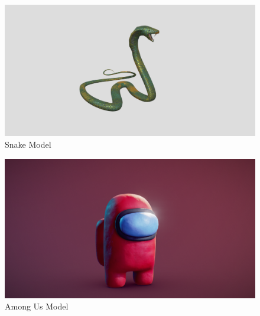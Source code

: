 \documentclass{article}
\begin{document}
    \begin{figure}
        \centering
        \includegraphics[width=\textwidth]{images/models/snake.png}
        \caption{Snake Model \cite{model-snake}} \label{fig:snake-model}
    \end{figure}
    \begin{figure}
        \centering
        \includegraphics[width=\textwidth]{images/models/among_us.png}
        \caption{Among Us Model \cite{model-among-us}} \label{fig:among-us-model}
    \end{figure}
\end{document}
